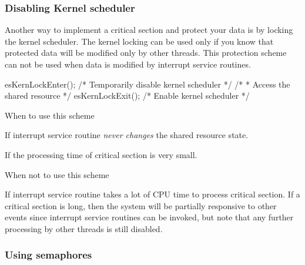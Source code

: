 \hypertarget{critical_section_cs_kernel_lock}{}\subsubsection{Disabling Kernel scheduler}\label{critical_section_cs_kernel_lock}
Another way to implement a critical section and protect your data is by locking the kernel scheduler. The kernel locking can be used only if you know that protected data will be modified only by other threads. This protection scheme can not be used when data is modified by interrupt service routines.


\begin{DoxyCode}
esKernLockEnter();                  \textcolor{comment}{/* Temporarily disable kernel scheduler  */}
\textcolor{comment}{/*}
\textcolor{comment}{ * Access the shared resource}
\textcolor{comment}{ */}
esKernLockExit();                   \textcolor{comment}{/* Enable kernel scheduler */}
\end{DoxyCode}
 \begin{DoxyParagraph}{When to use this scheme}

\begin{DoxyItemize}
\item If interrupt service routine {\itshape never changes} the shared resource state.
\item If the processing time of critical section is very small.
\end{DoxyItemize}
\end{DoxyParagraph}
\begin{DoxyParagraph}{When not to use this scheme}

\begin{DoxyItemize}
\item If interrupt service routine takes a lot of C\-P\-U time to process critical section. If a critical section is long, then the system will be partially responsive to other events since interrupt service routines can be invoked, but note that any further processing by other threads is still disabled.
\end{DoxyItemize}
\end{DoxyParagraph}
\hypertarget{critical_section_cs_sem_lock}{}\subsubsection{Using semaphores}\label{critical_section_cs_sem_lock}
